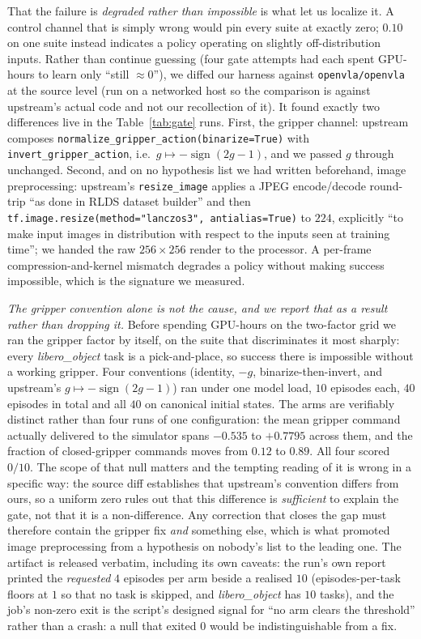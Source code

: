 \documentclass{article}
\begin{document}
That the failure is \emph{degraded rather than impossible} is what let us localize it. A control channel that is simply wrong would pin every suite at exactly zero; $0.10$ on one suite instead indicates a policy operating on slightly off-distribution inputs. Rather than continue guessing (four gate attempts had each spent GPU-hours to learn only ``still ${\approx}0$''), we diffed our harness against \texttt{openvla/openvla} at the source level (run on a networked host so the comparison is against upstream's actual code and not our recollection of it). It found exactly two differences live in the Table~\ref{tab:gate} runs. First, the gripper channel: upstream composes \texttt{normalize\_gripper\_action(binarize=True)} with \texttt{invert\_gripper\_action}, i.e.\ $g \mapsto -\operatorname{sign}(2g-1)$, and we passed $g$ through unchanged. Second, and on no hypothesis list we had written beforehand, image preprocessing: upstream's \texttt{resize\_image} applies a JPEG encode/decode round-trip ``as done in RLDS dataset builder'' and then \texttt{tf.image.resize(method="lanczos3", antialias=True)} to $224$, explicitly ``to make input images in distribution with respect to the inputs seen at training time''; we handed the raw $256{\times}256$ render to the processor. A per-frame compression-and-kernel mismatch degrades a policy without making success impossible, which is the signature we measured.

\emph{The gripper convention alone is not the cause, and we report that as a result rather than dropping it.} Before spending GPU-hours on the two-factor grid we ran the gripper factor by itself, on the suite that discriminates it most sharply: every \emph{libero\_object} task is a pick-and-place, so success there is impossible without a working gripper. Four conventions (identity, $-g$, binarize-then-invert, and upstream's $g \mapsto -\operatorname{sign}(2g{-}1)$) ran under one model load, $10$ episodes each, $40$ episodes in total and all $40$ on canonical initial states. The arms are verifiably distinct rather than four runs of one configuration: the mean gripper command actually delivered to the simulator spans $-0.535$ to $+0.7795$ across them, and the fraction of closed-gripper commands moves from $0.12$ to $0.89$. All four scored $0/10$. The scope of that null matters and the tempting reading of it is wrong in a specific way: the source diff establishes that upstream's convention differs from ours, so a uniform zero rules out that this difference is \emph{sufficient} to explain the gate, not that it is a non-difference. Any correction that closes the gap must therefore contain the gripper fix \emph{and} something else, which is what promoted image preprocessing from a hypothesis on nobody's list to the leading one. The artifact is released verbatim, including its own caveats: the run's own report printed the \emph{requested} $4$ episodes per arm beside a realised $10$ (episodes-per-task floors at $1$ so that no task is skipped, and \emph{libero\_object} has $10$ tasks), and the job's non-zero exit is the script's designed signal for ``no arm clears the threshold'' rather than a crash: a null that exited $0$ would be indistinguishable from a fix.
\end{document}
